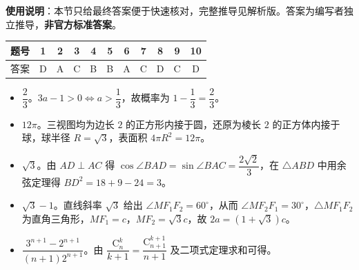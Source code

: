 
\begin{gknotice}
\textbf{使用说明}：本节只给最终答案便于快速核对，完整推导见解析版。答案为编写者独立推导，\textbf{非官方标准答案}。
\end{gknotice}

\begin{center}\begin{tabular}{ccccccccccc}
\toprule
题号 & 1 & 2 & 3 & 4 & 5 & 6 & 7 & 8 & 9 & 10 \\
\midrule
答案 & D & A & C & B & B & A & C & D & C & D \\
\bottomrule
\end{tabular}\end{center}

\begin{itemize}[leftmargin=2.6em]
  \item[\textbf{11.}] $\dfrac23$。$3a-1>0\Longleftrightarrow a>\dfrac13$，故概率为 $1-\dfrac13=\dfrac23$。
  \item[\textbf{12.}] $12\pi$。三视图均为边长 $2$ 的正方形内接于圆，还原为棱长 $2$ 的正方体内接于球，球半径 $R=\sqrt3$，表面积 $4\pi R^2=12\pi$。
  \item[\textbf{13.}] $\sqrt3$。由 $AD\perp AC$ 得 $\cos\angle BAD=\sin\angle BAC=\dfrac{2\sqrt2}{3}$，在 $\triangle ABD$ 中用余弦定理得 $BD^2=18+9-24=3$。
  \item[\textbf{14.}] $\sqrt3-1$。直线斜率 $\sqrt3$ 给出 $\angle MF_1F_2=60^\circ$，从而 $\angle MF_2F_1=30^\circ$，$\triangle MF_1F_2$ 为直角三角形，$MF_1=c$，$MF_2=\sqrt3c$，故 $2a=(1+\sqrt3)c$。
  \item[\textbf{15.}] $\dfrac{3^{n+1}-2^{n+1}}{(n+1)2^{n+1}}$。由 $\dfrac{\mathrm C_n^k}{k+1}=\dfrac{\mathrm C_{n+1}^{k+1}}{n+1}$ 及二项式定理求和可得。
\end{itemize}

